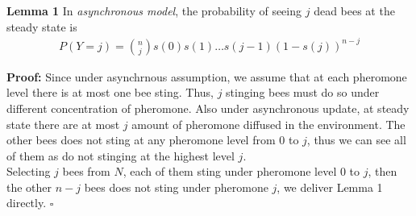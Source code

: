\documentclass[12pt]{article}
\newcommand*{\QED}{\hfill\ensuremath{\square}}
\begin{document}
\textbf{Lemma 1} In \textit{asynchronous model}, the probability of seeing $j$
dead bees at the steady state is
\begin{align}
  P(Y=j) = {n\choose j}s(0)s(1)\ldots s(j-1)(1 - s(j))^{n-j} 
\end{align}

\textbf{Proof:} Since under asynchrnous assumption, we assume that at each
pheromone level there is at most one bee sting. Thus, $j$ stinging bees must do
so under different concentration of pheromone. Also under asynchronous update,
at steady state there are at most $j$ amount of pheromone diffused in the
environment. The other bees does not sting at any pheromone level from $0$ to
$j$, thus we can see all of them as do not stinging at the highest level $j$.\\
Selecting $j$ bees from $N$, each of them sting under pheromone level $0$ to
$j$, then the other $n-j$ bees does not sting under pheromone $j$, we deliver
Lemma 1 directly. \QED
\end{document}
